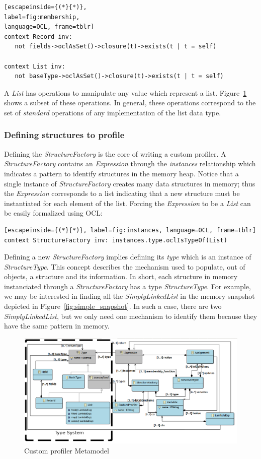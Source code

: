\begin{lstlisting}[escapeinside={(*}{*)},
label=fig:membership,
language=OCL, frame=tblr]
context Record inv: 
   not fields->oclAsSet()->closure(t)->exists(t | t = self)

context List inv:
   not baseType->oclAsSet()->closure(t)->exists(t | t = self)
\end{lstlisting} 

A \textit{List} has operations to manipulate any value which represent a list.
Figure~\ref{fig:as} shows a subset of these operations.
In general, these operations correspond to the set of \textit{standard} operations of any implementation of the list data type.

\subsubsection{Defining structures to profile}
Defining the \textit{StructureFactory} is the core of writing a custom profiler.
A \textit{StructureFactory} contains an \textit{Expression} through the \textit{instances} relationship which indicates a pattern to identify structures in the memory heap.
Notice that a single instance of \textit{StructureFactory} creates many data structures in memory; thus the \textit{Expression} corresponds to a list indicating that a new structure must be instantiated for each element of the list.
Forcing the \textit{Expression} to be a \textit{List} can be easily formalized using OCL:

\begin{lstlisting}[escapeinside={(*}{*)}, label=fig:instances, language=OCL, frame=tblr]
context StructureFactory inv: instances.type.oclIsTypeOf(List)
\end{lstlisting}

Defining a new \textit{StructureFactory} implies defining its \textit{type} which is an instance of \textit{StructureType}.
This concept describes the mechanism used to populate, out of objects, a structure and its information.
In short, each structure in memory instanciated through a \textit{StructureFactory} has a type \textit{StructureType}.
For example, we may be interested in finding all the \textit{SimplyLinkedList} in the memory snapshot depicted in Figure~\ref{fig:simple_snapshot}.
In such a case, there are two \textit{SimplyLinkedList}, but we only need one mechanism to identify them because they have the same pattern in memory. 

\begin{figure}
\centering
\includegraphics[width=0.87\linewidth]{chapter6/fig/AS}
\caption{Custom profiler Metamodel}
\label{fig:as}
\end{figure}

